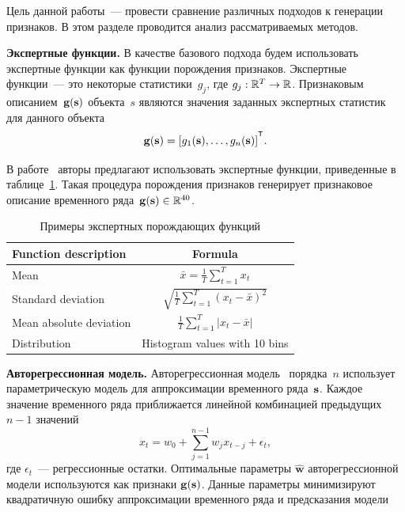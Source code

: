 \documentclass[11pt, a5paper]{dissert}
\begin{document}
Цель данной работы~--- провести сравнение различных подходов к генерации признаков.
В этом разделе проводится анализ рассматриваемых методов.

\textbf{Экспертные функции.}
В качестве базового подхода будем использовать экспертные функции как функции порождения признаков.
Экспертные функции~--- это некоторые статистики~$g_j$, где $g_j: \mathbb{R}^T \rightarrow \mathbb{R}$.
Признаковым описанием~$\mathbf{g}(\mathbf{s})$ объекта~$s$ являются значения заданных экспертных статистик для данного объекта
\[
	\mathbf{g}(\bs) = [g_1(\bs), \dots, g_n(\bs)]^{\T}.
\]

В работе~\cite{kwapisz2011activity} авторы предлагают использовать экспертные функции, приведенные в таблице~\ref{ch6:tbl:expert_functions}.
Такая процедура порождения признаков генерирует признаковое описание временного ряда~$\mathbf{g}(\mathbf{s}) \in \mathbb{R}^{40}$.

\begin{table}[ht]
	\centering
	\caption{Примеры экспертных порождающих функций}
	\begin{tabular}{|l|c|}
		\hline
		\textbf{Function description}    & \textbf{Formula} \\ \hline
		Mean                    & $\bar{x} = \frac{1}{T} \sum_{t=1}^{T} x_t$    \\ \hline
		Standard deviation      & $\sqrt{\frac{1}{T} \sum_{t=1}^{T} (x_t - \bar{x})^2}$    \\ \hline
		Mean absolute deviation & $\frac{1}{T} \sum_{t=1}^{T} |x_t - \bar{x}|$    \\ \hline
		Distribution            &  Histogram values with 10 bins    \\ \hline
	\end{tabular}
	\label{ch6:tbl:expert_functions}
\end{table}

\textbf{Авторегрессионная модель.}
Авторегрессионная модель~\cite{lukashin2003adaptive} порядка~$n$
использует параметрическую модель для аппроксимации временного ряда~$\mathbf{s}$. 
Каждое значение временного ряда приближается линейной комбинацией предыдущих $n-1$ значений
\begin{equation*}
	x_t = w_0 + \sum_{j=1}^{n-1} w_j x_{t-j} + \epsilon_t,
\end{equation*}
где $\epsilon_t$~--- регрессионные остатки.
Оптимальные параметры $\hat{\mathbf{w}}$ авторегрессионной модели используются как признаки $\mathbf{g}(\mathbf{s})$.
Данные параметры минимизируют квадратичную ошибку аппроксимации временного ряда и предсказания модели
\end{document}

